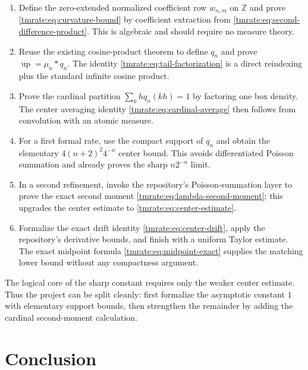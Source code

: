 \documentclass[11pt,oneside]{article}
\theoremstyle{definition}
\theoremstyle{remark}
\newcommand{\Z}{\mathbb Z}
\newcommand{\Up}{\operatorname{up}}
\begin{document}
\begin{enumerate}
\item Define the zero-extended normalized coefficient row $w_{n,m}$ on $\Z$ and
      prove \eqref{tmrate:eq:curvature-bound} by coefficient extraction from
      \eqref{tmrate:eq:second-difference-product}.  This is algebraic and should require
      no measure theory.

\item Reuse the existing cosine-product theorem to define $q_n$ and prove
      $\Up=\mu_n*q_n$.  The identity \eqref{tmrate:eq:tail-factorization} is a direct
      reindexing plus the standard infinite cosine product.

\item Prove the cardinal partition
      $\sum_k hq_n(kh)=1$ by factoring one box density.  The center averaging
      identity \eqref{tmrate:eq:cardinal-average} then follows from convolution with an
      atomic measure.

\item For a first formal rate, use the compact support of $q_n$ and obtain the
      elementary $4(n+2)^2 4^{-n}$ center bound.  This avoids differentiated
      Poisson summation and already proves the sharp $n2^{-n}$ limit.

\item In a second refinement, invoke the repository's Poisson-summation layer to
      prove the exact second moment \eqref{tmrate:eq:lambda-second-moment}; this upgrades
      the center estimate to \eqref{tmrate:eq:center-estimate}.

\item Formalize the exact drift identity \eqref{tmrate:eq:center-drift}, apply the
      repository's derivative bounds, and finish with a uniform Taylor estimate.
      The exact midpoint formula \eqref{tmrate:eq:midpoint-exact} supplies the matching
      lower bound without any compactness argument.
\end{enumerate}

The logical core of the sharp constant requires only the weaker center estimate.
Thus the project can be split cleanly: first formalize the asymptotic constant
$1$ with elementary support bounds, then strengthen the remainder by adding the
cardinal second-moment calculation.

\section{Conclusion}
\label{tmrate:sec:conclusion}
\end{document}
